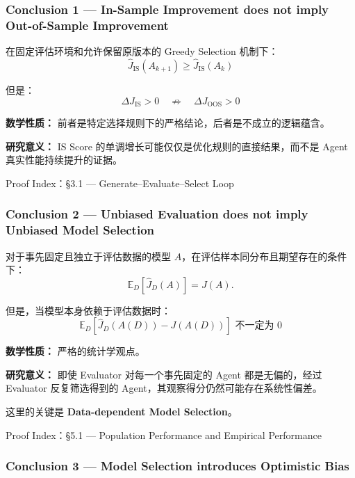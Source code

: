 \hypertarget{part-1-10-0001-conclusion-1-in-sample-improvement-does-not-imply-out-of-sample-improvement}{%
\subsubsection{Conclusion 1 --- In-Sample Improvement does not imply Out-of-Sample Improvement}\label{part-1-10-0001-conclusion-1-in-sample-improvement-does-not-imply-out-of-sample-improvement}}

在固定评估环境和允许保留原版本的 Greedy Selection 机制下：
\[\boxed{
\widehat J_{\mathrm{IS}}(A_{k+1})
\geq
\widehat J_{\mathrm{IS}}(A_k)
}\]

但是：
\[\boxed{
\Delta J_{\mathrm{IS}}>0
\quad\not\Rightarrow\quad
\Delta J_{\mathrm{OOS}}>0
}\]

\textbf{数学性质：} 前者是特定选择规则下的严格结论，后者是不成立的逻辑蕴含。

\textbf{研究意义：} IS Score 的单调增长可能仅仅是优化规则的直接结果，而不是 Agent 真实性能持续提升的证据。

Proof Index：§3.1 --- Generate--Evaluate--Select Loop

\hypertarget{part-1-10-0001-conclusion-2-unbiased-evaluation-does-not-imply-unbiased-model-selection}{%
\subsubsection{Conclusion 2 --- Unbiased Evaluation does not imply Unbiased Model Selection}\label{part-1-10-0001-conclusion-2-unbiased-evaluation-does-not-imply-unbiased-model-selection}}

对于事先固定且独立于评估数据的模型 \(A\)，在评估样本同分布且期望存在的条件下：
\[\mathbb E_D[\widehat J_D(A)]
=
J(A).\]

但是，当模型本身依赖于评估数据时：
\[\boxed{
\mathbb E_D
\left[
\widehat J_D(A(D))-J(A(D))
\right]
\text{ 不一定为 }0
}\]

\textbf{数学性质：} 严格的统计学观点。

\textbf{研究意义：} 即使 Evaluator 对每一个事先固定的 Agent 都是无偏的，经过 Evaluator 反复筛选得到的 Agent，其观察得分仍然可能存在系统性偏差。

这里的关键是 \textbf{Data-dependent Model Selection}。

Proof Index：§5.1 --- Population Performance and Empirical Performance

\hypertarget{part-1-10-0001-conclusion-3-model-selection-introduces-optimistic-bias}{%
\subsubsection{Conclusion 3 --- Model Selection introduces Optimistic Bias}\label{part-1-10-0001-conclusion-3-model-selection-introduces-optimistic-bias}}

